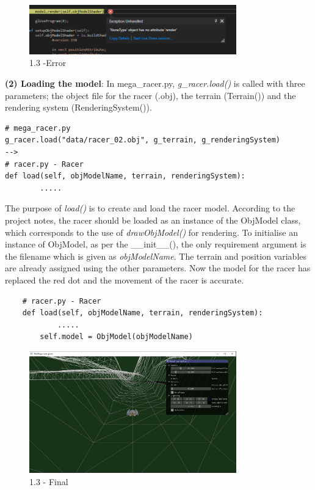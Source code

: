 \documentclass[a4 paper, 12pt]{article}
\begin{document}
    \begin{figure} [H]
        \centering
        \includegraphics[width=0.8\textwidth, frame]
            {./images/mega_racer/1.3_a.PNG}
        \caption{1.3 -Error}
    \end{figure}

\textbf{(2) Loading the model}: 
In mega\_racer.py, \textit{g\_racer.load()} is called with three parameters; the object file for the racer (.obj), the terrain (Terrain()) and the rendering system (RenderingSystem()). 
    \begin{lstlisting}
# mega_racer.py
g_racer.load("data/racer_02.obj", g_terrain, g_renderingSystem)
-->
# racer.py - Racer
def load(self, objModelName, terrain, renderingSystem):
        .....    
    \end{lstlisting}

The purpose of \textit{load()} is to create and load the racer model. According to the project notes, the racer should be loaded as an instance of the ObjModel class, which corresponds to the use of \textit{drawObjModel()} for rendering. To initialise an instance of ObjModel, as per the \_\_init\_\_(), the only requirement argument is the filename which is given as \textit{objModelName}. The terrain and position variables are already assigned using the other parameters. Now the model for the racer has replaced the red dot and the movement of the racer is accurate.
    \begin{lstlisting}
    # racer.py - Racer
    def load(self, objModelName, terrain, renderingSystem):
            ..... 
        self.model = ObjModel(objModelName)
    \end{lstlisting}   

\begin{figure} [H]
    \centering
    \includegraphics[width=0.8\textwidth, frame]
        {./images/mega_racer/1.3_b.PNG}
    \caption{1.3 - Final}
\end{figure}
\end{document}
